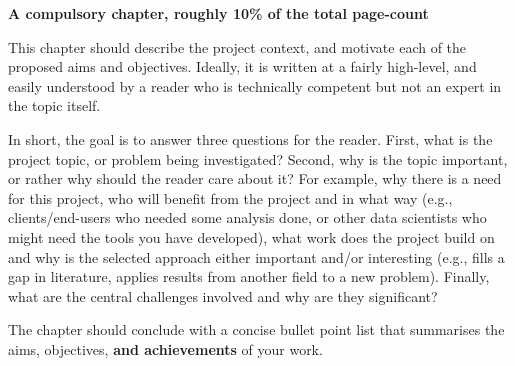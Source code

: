 {\bf A compulsory chapter, roughly 10\% of the total page-count}
\vspace{1cm} 
		
\noindent
This chapter should describe the project context, and motivate each of
the proposed aims and objectives.  Ideally, it is written at a fairly 
high-level, and easily understood by a reader who is technically 
competent but not an expert in the topic itself.

In short, the goal is to answer three questions for the reader.  First, 
what is the project topic, or problem being investigated?  Second, why 
is the topic important, or rather why should the reader care about it?  
For example, why there is a need for this project, who will benefit from the 
project and in what way (e.g., clients/end-users who needed some analysis
done, or other data scientists who might need the tools you have developed), what 
work does the project build on and why is the selected approach either
important and/or interesting (e.g., fills a gap in literature, applies
results from another field to a new problem).  Finally, what are the 
central challenges involved and why are they significant? 
 
The chapter should conclude with a concise bullet point list that 
summarises the aims, objectives, {\bf and achievements}\/ of your work. 


